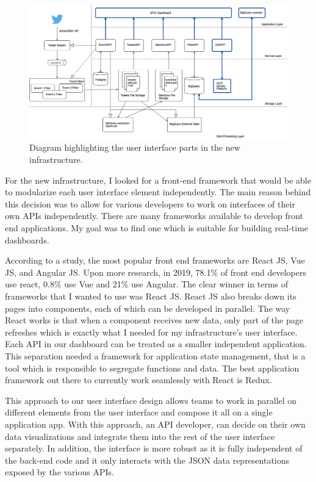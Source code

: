 \begin{figure}[htbp]
	\caption{\label{fig:newinfrui}
	Diagram highlighting the user interface parts in the new infrastructure.
	}
    \begin{center}
	\includegraphics[width=150mm]{figs/infrav1_ui.png}
    \end{center}
\label{xfigDiagram}
\end{figure}

For the new infrastructure, I looked for a front-end framework that would be able to modularize each user interface element independently. The main reason behind this decision was to allow for various developers to work on interfaces of their own APIs independently. There are many frameworks available to develop front end applications. My goal was to find one which is suitable for building real-time dashboards. 

According to a study, the most popular front end frameworks are React JS, Vue JS, and Angular JS. Upon more research, in 2019, 78.1\% of front end developers use react, 0.8\% use Vue and 21\% use Angular. The clear winner in terms of frameworks that I wanted to use was React JS. React JS also breaks down its pages into components, each of which can be developed in parallel. The way React works is that when a component receives new data, only part of the page refreshes  which is exactly what I needed for my infrastructure's user interface. Each API in our dashboard can be treated as a smaller independent application. This separation needed a framework for application state management, that is a tool which is responsible to segregate functions and data. The best application framework out there to currently work seamlessly with React is Redux.

This approach to our user interface design allows teams to work in parallel on different elements from the user interface and compose it all on a single application app. With this approach, an API developer, can decide on their own data visualizations and integrate them into the rest of the user interface separately. In addition, the interface is more robust as it is fully independent of the back-end code and it only interacts with the JSON data representations exposed by the various APIs.

